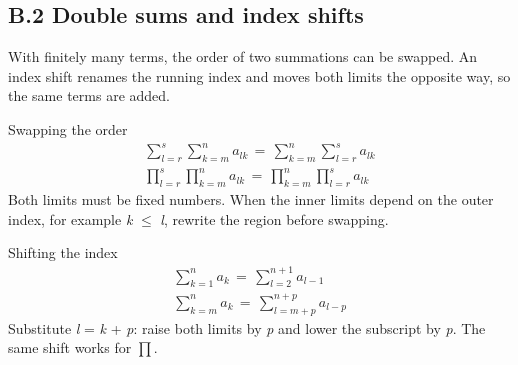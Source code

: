 \documentclass[11pt]{article}
\begin{document}
\begin{keepsection}
\section{B.2 Double sums and index shifts}

With finitely many terms, the order of two summations can be swapped. An index shift renames the running index and moves both limits the opposite way, so the same terms are added.

\begin{equationcard}{Swapping the order}
\[ \begin{gathered} \sum_{{l}={r}}^{{s}} \sum_{{k}={m}}^{{n}} {a}_{{l}{k}}\, =\, \sum_{{k}={m}}^{{n}} \sum_{{l}={r}}^{{s}} {a}_{{l}{k}} \\ \prod_{{l}={r}}^{{s}} \prod_{{k}={m}}^{{n}} {a}_{{l}{k}}\, =\, \prod_{{k}={m}}^{{n}} \prod_{{l}={r}}^{{s}} {a}_{{l}{k}} \end{gathered} \]
{\small Both limits must be fixed numbers. When the inner limits depend on the outer index, for example \textit{k} \ensuremath{\leq} \textit{l}, rewrite the region before swapping.}
\end{equationcard}

\begin{equationcard}{Shifting the index}
\[ \begin{gathered} \sum_{{k}=1}^{{n}} {a}_{{k}}\, =\, \sum_{{l}=2}^{{n}+1} {a}_{{l}-1} \\ \sum_{{k}={m}}^{{n}} {a}_{{k}}\, =\, \sum_{{l}={m}+{p}}^{{n}+{p}} {a}_{{l}-{p}} \end{gathered} \]
{\small Substitute \textit{l} = \textit{k} + \textit{p}: raise both limits by \textit{p} and lower the subscript by \textit{p}. The same shift works for \ensuremath{\textstyle\prod}.}
\end{equationcard}
\end{keepsection}
\end{document}
